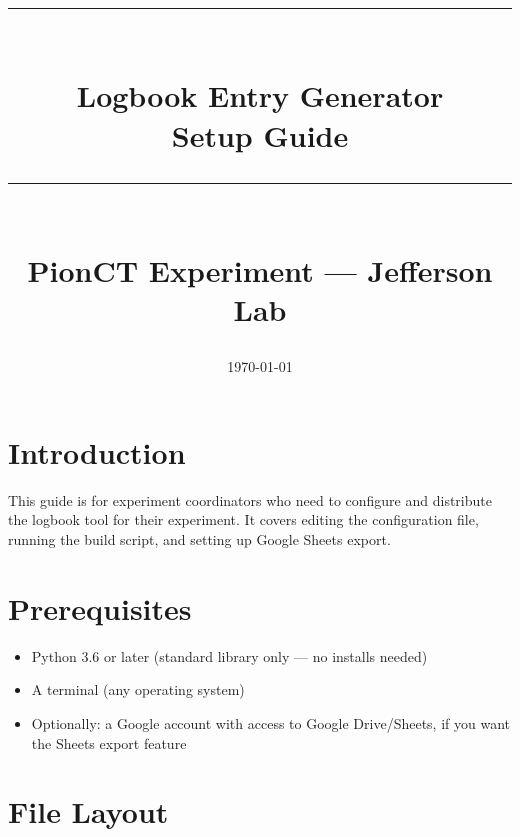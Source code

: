 



\title{
    \vspace{2cm}
    {\color{pionorange}\rule{\linewidth}{2pt}}\\[0.6em]
    {\Huge\bfseries Logbook Entry Generator}\\[0.3em]
    {\Large Setup Guide}\\[0.4em]
    {\color{pionorange}\rule{\linewidth}{2pt}}\\[1em]
    {\large PionCT Experiment --- Jefferson Lab}
    \vspace{1cm}
}
\author{}
\date{\today}
\maketitle
\thispagestyle{empty}

\tableofcontents
\newpage

\chapter{Introduction}

This guide is for experiment coordinators who need to configure and distribute
the logbook tool for their experiment. It covers editing the configuration
file, running the build script, and setting up Google Sheets export.

\chapter{Prerequisites}

\begin{itemize}
    \item Python 3.6 or later (standard library only --- no  installs
          needed)
    \item A terminal (any operating system)
    \item Optionally: a Google account with access to Google Drive/Sheets, if
          you want the Sheets export feature
\end{itemize}

\chapter{File Layout}

